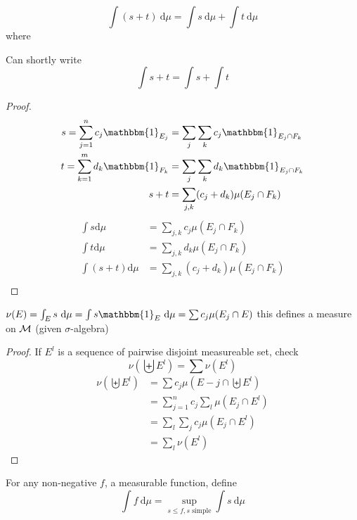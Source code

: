 \begin{lemma}
  \[\int (s + t)\ \mathrm{d}\mu = \int s \ \mathrm{d}\mu+ \int t\ \mathrm{d}\mu\] 
  where 
\end{lemma}

\begin{remark}
  Can shortly write 
  \[\int s + t = \int s + \int t\]
\end{remark}

\begin{proof}
  \begin{align*}
  s = \sum_{j=1}^n c_j \mathbbm{1}_{E_j} &= \sum_{j}\sum_k c_j \mathbbm{1}_{E_{j} \cap F_k} \\
  t = \sum_{k=1}^m d_k \mathbbm{1}_{F_k} &= \sum_{j}\sum_k d_k \mathbbm{1}_{E_{j} \cap F_k} \\
  s + t&= \sum_{j, k} (c_j + d_k) \mu(E_j \cap F_k) \\
  \end{align*} 
  \begin{align*}
    \int s \mathrm{d}\mu &= \sum_{j, k}c_j \mu(E_j \cap F_k) \\
    \int t \mathrm{d}\mu &= \sum_{j, k}d_k \mu(E_j \cap F_k) \\
    \int (s + t) \mathrm{d}\mu &= \sum_{j, k}(c_j + d_k) \mu(E_j \cap F_k) \\
  \end{align*}
\end{proof}

\begin{lemma}
  $\nu(E) = \int_E s \ \mathrm{d}\mu = \int s \mathbbm{1}_E\ \mathrm{d}\mu = \sum c_j \mu(E_j \cap E)$
  this defines a measure on $\mathcal M$ (given $\sigma$-algebra)
\end{lemma}

\begin{proof}
  If $E^l$ is a sequence of pairwise disjoint measureable set, check
  \[\nu\left(\biguplus E^l\right) = \sum \nu(E^l)\] 
  \begin{align*}
    \nu\left(\biguplus E^l\right) &= \sum c_j \mu(E-j \cap \biguplus E^l) \\
    &= \sum_{j=1}^n c_j \sum_l \mu(E_j \cap E^l) \\
    &= \sum_l \sum_j c_j \mu(E_j \cap E^l) \\
    &= \sum_l \nu(E^l)
  \end{align*}
\end{proof}

\begin{definition}
  For any non-negative $f$, a measurable function, define
  \[\int f \ \mathrm{d}\mu = \sup_{s \le f, s \text{ simple}} \int s \ \mathrm{d}\mu\]
\end{definition}




